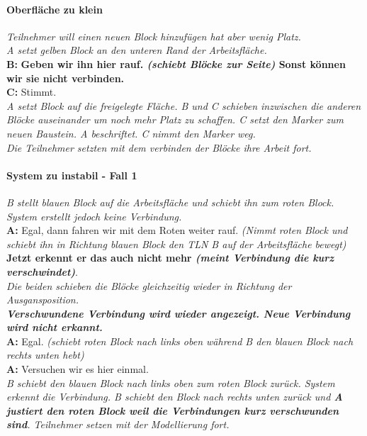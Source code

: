 \paragraph{Oberfläche zu klein} 

\begin{transkript}
\emph{Teilnehmer will einen neuen Block hinzufügen hat aber wenig Platz.} \\
\emph{A setzt gelben Block an den unteren Rand der Arbeitsfläche.} \\
\textbf{B:} \textbf{Geben wir ihn hier rauf. \emph{(schiebt Blöcke zur Seite)} Sonst können wir sie nicht verbinden.} \\
\textbf{C:} Stimmt. \\
\emph{A setzt Block auf die freigelegte Fläche. B und C schieben inzwischen die anderen Blöcke auseinander um noch mehr Platz zu schaffen. C setzt den Marker zum neuen Baustein. A beschriftet. C nimmt den Marker weg.} \\
\emph{Die Teilnehmer setzten mit dem verbinden der Blöcke ihre Arbeit fort.} \\
\end{transkript}

\paragraph{System zu instabil - Fall 1}

\begin{transkript}
\emph{B stellt blauen Block auf die Arbeitsfläche und schiebt ihn zum roten Block. System erstellt jedoch keine Verbindung.} \\
\textbf{A:} Egal, dann fahren wir mit dem Roten weiter rauf. \emph{(Nimmt roten Block und schiebt ihn in Richtung blauen Block den TLN B auf der Arbeitsfläche bewegt)} \textbf{Jetzt erkennt er das auch nicht mehr \emph{(meint Verbindung die kurz verschwindet)}}. \\
\emph{Die beiden schieben die Blöcke gleichzeitig wieder in Richtung der Ausgansposition.} \\ \emph{\textbf{Verschwundene Verbindung wird wieder angezeigt. Neue Verbindung wird nicht erkannt.}} \\
\textbf{A:} Egal. \emph{(schiebt roten Block nach links oben während B den blauen Block nach rechts unten hebt)} \\
\textbf{A:} Versuchen wir es hier einmal. \\
\emph{B schiebt den blauen Block nach links oben zum roten Block zurück. System erkennt die Verbindung. B schiebt den Block nach rechts unten zurück und \textbf{A justiert den roten Block weil die Verbindungen kurz verschwunden sind}. Teilnehmer setzen mit der Modellierung fort.}
\end{transkript}

